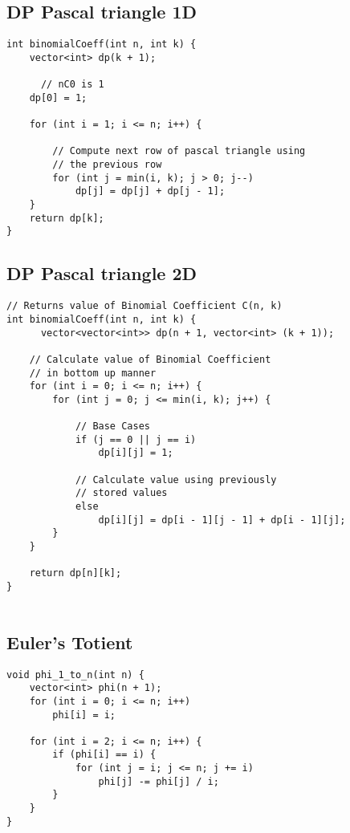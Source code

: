 \documentclass[10pt]{article}
\begin{document}
\begin{multicols*}{2}
\subsection{DP Pascal triangle 1D}
\begin{lstlisting}[style=compactcpp]
int binomialCoeff(int n, int k) {
    vector<int> dp(k + 1);

      // nC0 is 1
    dp[0] = 1; 

    for (int i = 1; i <= n; i++) {
      
        // Compute next row of pascal triangle using
        // the previous row
        for (int j = min(i, k); j > 0; j--)
            dp[j] = dp[j] + dp[j - 1];
    }
    return dp[k];
}
\end{lstlisting}
\subsection{DP Pascal triangle 2D}
\begin{lstlisting}[style=compactcpp]
    // Returns value of Binomial Coefficient C(n, k)
int binomialCoeff(int n, int k) {
      vector<vector<int>> dp(n + 1, vector<int> (k + 1));
  
    // Calculate value of Binomial Coefficient
    // in bottom up manner
    for (int i = 0; i <= n; i++) {
        for (int j = 0; j <= min(i, k); j++) {
          
            // Base Cases
            if (j == 0 || j == i)
                dp[i][j] = 1;

            // Calculate value using previously
            // stored values
            else
                dp[i][j] = dp[i - 1][j - 1] + dp[i - 1][j];
        }
    }

    return dp[n][k];
}
    
\end{lstlisting}


\subsection{Euler's Totient}

\begin{lstlisting}[style=compactcpp]
void phi_1_to_n(int n) {
    vector<int> phi(n + 1);
    for (int i = 0; i <= n; i++)
        phi[i] = i;

    for (int i = 2; i <= n; i++) {
        if (phi[i] == i) {
            for (int j = i; j <= n; j += i)
                phi[j] -= phi[j] / i;
        }
    }
}


\end{lstlisting}
\end{multicols*}
\end{document}
